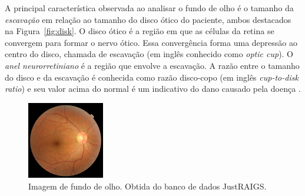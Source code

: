 \documentclass[12pt]{article}
\begin{document}
A principal característica observada ao analisar o fundo de olho é o tamanho da \emph{escavação} em relação ao tamanho do disco ótico do paciente, ambos destacados na Figura~\ref{fig:disk}. O disco ótico é a região em que as células da retina se convergem para formar o nervo ótico. Essa convergência forma uma depressão ao centro do disco, chamada de escavação (em inglês conhecido como \emph{optic cup}). O \emph{anel neurorretiniano} é a região que envolve a escavação. A razão entre o tamanho do disco e da escavação é conhecida como razão disco-copo (em inglês \emph{cup-to-disk ratio}) e seu valor acima do normal é um indicativo do dano causado pela doença \cite{weinreb_2004}. %

\begin{figure}[htb]
 \centering
 \includegraphics[width=0.3\textwidth]{images/TRAIN000004_cut.JPG}
 \caption{Imagem de fundo de olho. Obtida do banco de dados JustRAIGS.}
 \label{fig:fundus}
\end{figure}

\end{document}
